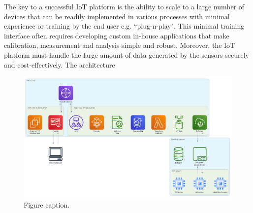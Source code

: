 \documentclass[twocolumn,5p]{elsevier}
\begin{document}
The key to a successful IoT platform is the ability to scale to a large number
of devices that can be readily implemented in various processes with minimal experience or training by the end user e.g. ``plug-n-play". This minimal training interface often requires
developing custom in-house applications that make calibration, measurement and analysis
simple and robust. Moreover, the IoT platform must handle the large amount of
data generated by the sensors securely and cost-effectively. The architecture


\begin{figure}[ht] 
    \centering
    \includegraphics[width=0.7\columnwidth]{./img/architecture.png}
    \caption{Figure caption.
    \label{fig:architecture}}
\end{figure}
\end{document}
